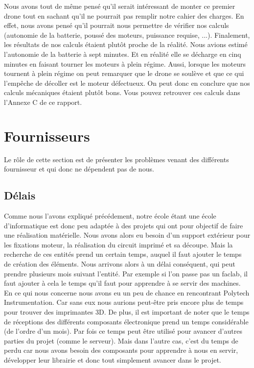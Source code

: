\documentclass[a4paper,10pt]{report}
\begin{document}
	Nous avons tout de même pensé qu'il serait intéressant de monter ce 
premier drone tout en sachant qu'il ne pourrait pas remplir notre cahier des 
charges. En effet, nous avons pensé qu'il pourrait nous permettre de vérifier 
nos calculs (autonomie de la batterie, poussé des moteurs, puissance requise, 
...). Finalement, les résultats de nos calculs étaient plutôt proche de la 
réalité. Nous avions estimé l'autonomie de la batterie à sept minutes. Et en 
réalité elle se décharge en cinq minutes en faisant tourner les moteurs à plein 
régime. Aussi, lorsque les moteurs tournent à plein régime on peut remarquer 
que le drone se soulève et que ce qui l'empêche de décoller est le moteur 
défectueux. On peut donc en conclure que nos calculs mécaniques étaient plutôt 
bons. Vous pouvez retrouver ces calculs dans l'Annexe C de ce rapport.
    
    \section{Fournisseurs}
      Le rôle de cette section est de présenter les problèmes venant des 
différents fournisseur et qui donc ne dépendent pas de nous.
      \subsection{Délais}
	Comme nous l'avons expliqué précédement, notre école étant une école 
d'informatique est donc peu adaptée à des projets qui ont pour objectif de 
faire une réalisation matérielle. Nous avons alors eu besoin d'un support 
extérieur pour les fixations moteur, la réalisation du circuit imprimé et sa 
découpe. Mais la recherche de ces entités prend un certain temps, auquel il 
faut ajouter le temps de création des éléments. Nous arrivons alors à un délai 
conséquent, qui peut prendre plusieurs mois suivant l'entité. Par exemple si 
l'on passe pas un faclab, il faut ajouter à cela le temps qu'il faut pour 
apprendre à se servir des machines. En ce qui nous concerne nous avons eu un 
peu de chance en rencontrant Polytech Instrumentation. Car sans eux nous 
aurions peut-être pris encore plus de temps pour trouver des imprimantes 3D. 
De plus, il est important de noter que le temps de réceptions des différents 
composants électronique prend un temps considérable (de l'ordre d'un mois). Par 
fois ce temps peut être utilisé pour avancer d'autres parties du projet (comme 
le serveur). Mais dans l'autre cas, c'est du temps de perdu car nous avons 
besoin des composants pour apprendre à nous en servir, développer leur 
librairie et donc tout simplement avancer dans le projet.
\end{document}
